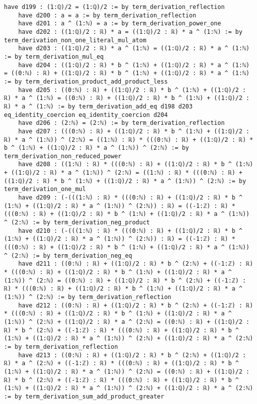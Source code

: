 \documentclass{article}
\begin{document}
\begin{tcolorbox}[colback=white!10, width=\linewidth]
\begin{lstlisting}[language=Lean4]
    have d199 : (1:ℚ)/2 = (1:ℚ)/2 := by term_derivation_reflection
    have d200 : a = a := by term_derivation_reflection
    have d201 : a ^ (1:ℕ) = a := by term_derivation_power_one
    have d202 : ((1:ℚ)/2 : ℝ) * a = ((1:ℚ)/2 : ℝ) * a ^ (1:ℕ) := by term_derivation_non_one_literal_mul_atom
    have d203 : ((1:ℚ)/2 : ℝ) * a ^ (1:ℕ) = ((1:ℚ)/2 : ℝ) * a ^ (1:ℕ) := by term_derivation_mul_eq
    have d204 : ((1:ℚ)/2 : ℝ) * b ^ (1:ℕ) + ((1:ℚ)/2 : ℝ) * a ^ (1:ℕ) = ((0:ℕ) : ℝ) + ((1:ℚ)/2 : ℝ) * b ^ (1:ℕ) + ((1:ℚ)/2 : ℝ) * a ^ (1:ℕ) := by term_derivation_product_add_product_less
    have d205 : ((0:ℕ) : ℝ) + ((1:ℚ)/2 : ℝ) * b ^ (1:ℕ) + ((1:ℚ)/2 : ℝ) * a ^ (1:ℕ) = ((0:ℕ) : ℝ) + ((1:ℚ)/2 : ℝ) * b ^ (1:ℕ) + ((1:ℚ)/2 : ℝ) * a ^ (1:ℕ) := by term_derivation_add_eq d198 d203 eq_identity_coercion eq_identity_coercion d204
    have d206 : (2:ℕ) = (2:ℕ) := by term_derivation_reflection
    have d207 : (((0:ℕ) : ℝ) + ((1:ℚ)/2 : ℝ) * b ^ (1:ℕ) + ((1:ℚ)/2 : ℝ) * a ^ (1:ℕ)) ^ (2:ℕ) = ((1:ℕ) : ℝ) * (((0:ℕ) : ℝ) + ((1:ℚ)/2 : ℝ) * b ^ (1:ℕ) + ((1:ℚ)/2 : ℝ) * a ^ (1:ℕ)) ^ (2:ℕ) := by term_derivation_non_reduced_power
    have d208 : ((1:ℕ) : ℝ) * (((0:ℕ) : ℝ) + ((1:ℚ)/2 : ℝ) * b ^ (1:ℕ) + ((1:ℚ)/2 : ℝ) * a ^ (1:ℕ)) ^ (2:ℕ) = ((1:ℕ) : ℝ) * (((0:ℕ) : ℝ) + ((1:ℚ)/2 : ℝ) * b ^ (1:ℕ) + ((1:ℚ)/2 : ℝ) * a ^ (1:ℕ)) ^ (2:ℕ) := by term_derivation_one_mul
    have d209 : (-(((1:ℕ) : ℝ) * (((0:ℕ) : ℝ) + ((1:ℚ)/2 : ℝ) * b ^ (1:ℕ) + ((1:ℚ)/2 : ℝ) * a ^ (1:ℕ)) ^ (2:ℕ)) : ℝ) = ((-1:ℤ) : ℝ) * (((0:ℕ) : ℝ) + ((1:ℚ)/2 : ℝ) * b ^ (1:ℕ) + ((1:ℚ)/2 : ℝ) * a ^ (1:ℕ)) ^ (2:ℕ) := by term_derivation_neg_product
    have d210 : (-(((1:ℕ) : ℝ) * (((0:ℕ) : ℝ) + ((1:ℚ)/2 : ℝ) * b ^ (1:ℕ) + ((1:ℚ)/2 : ℝ) * a ^ (1:ℕ)) ^ (2:ℕ)) : ℝ) = ((-1:ℤ) : ℝ) * (((0:ℕ) : ℝ) + ((1:ℚ)/2 : ℝ) * b ^ (1:ℕ) + ((1:ℚ)/2 : ℝ) * a ^ (1:ℕ)) ^ (2:ℕ) := by term_derivation_neg_eq
    have d211 : ((0:ℕ) : ℝ) + ((1:ℚ)/2 : ℝ) * b ^ (2:ℕ) + ((-1:ℤ) : ℝ) * (((0:ℕ) : ℝ) + ((1:ℚ)/2 : ℝ) * b ^ (1:ℕ) + ((1:ℚ)/2 : ℝ) * a ^ (1:ℕ)) ^ (2:ℕ) = ((0:ℕ) : ℝ) + ((1:ℚ)/2 : ℝ) * b ^ (2:ℕ) + ((-1:ℤ) : ℝ) * (((0:ℕ) : ℝ) + ((1:ℚ)/2 : ℝ) * b ^ (1:ℕ) + ((1:ℚ)/2 : ℝ) * a ^ (1:ℕ)) ^ (2:ℕ) := by term_derivation_reflection
    have d212 : ((0:ℕ) : ℝ) + ((1:ℚ)/2 : ℝ) * b ^ (2:ℕ) + ((-1:ℤ) : ℝ) * (((0:ℕ) : ℝ) + ((1:ℚ)/2 : ℝ) * b ^ (1:ℕ) + ((1:ℚ)/2 : ℝ) * a ^ (1:ℕ)) ^ (2:ℕ) + ((1:ℚ)/2 : ℝ) * a ^ (2:ℕ) = ((0:ℕ) : ℝ) + ((1:ℚ)/2 : ℝ) * b ^ (2:ℕ) + ((-1:ℤ) : ℝ) * (((0:ℕ) : ℝ) + ((1:ℚ)/2 : ℝ) * b ^ (1:ℕ) + ((1:ℚ)/2 : ℝ) * a ^ (1:ℕ)) ^ (2:ℕ) + ((1:ℚ)/2 : ℝ) * a ^ (2:ℕ) := by term_derivation_reflection
    have d213 : ((0:ℕ) : ℝ) + ((1:ℚ)/2 : ℝ) * b ^ (2:ℕ) + ((1:ℚ)/2 : ℝ) * a ^ (2:ℕ) + ((-1:ℤ) : ℝ) * (((0:ℕ) : ℝ) + ((1:ℚ)/2 : ℝ) * b ^ (1:ℕ) + ((1:ℚ)/2 : ℝ) * a ^ (1:ℕ)) ^ (2:ℕ) = ((0:ℕ) : ℝ) + ((1:ℚ)/2 : ℝ) * b ^ (2:ℕ) + ((-1:ℤ) : ℝ) * (((0:ℕ) : ℝ) + ((1:ℚ)/2 : ℝ) * b ^ (1:ℕ) + ((1:ℚ)/2 : ℝ) * a ^ (1:ℕ)) ^ (2:ℕ) + ((1:ℚ)/2 : ℝ) * a ^ (2:ℕ) := by term_derivation_sum_add_product_greater

\end{lstlisting}
\end{tcolorbox}
\end{document}

